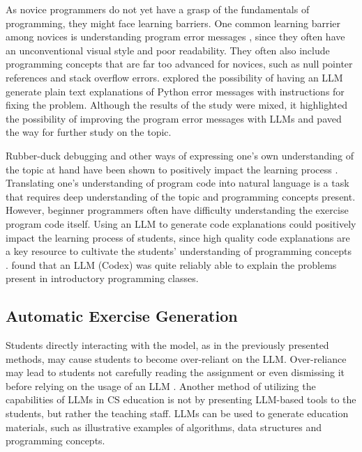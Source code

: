 \documentclass[english, 12pt, a4paper, sci, utf8, a-2b, online]{../definitions/aaltothesis}
\begin{document}
As novice programmers do not yet have a grasp of the fundamentals of programming, they might face learning barriers. One common learning barrier among novices is understanding program error messages \cite{10.1145/3328778.3366882}, since they often have an unconventional visual style and poor readability. They often also include programming concepts that are far too advanced for novices, such as null pointer references and stack overflow errors. \textcite{10.1145/3545945.3569770} explored the possibility of having an LLM generate plain text explanations of Python error messages with instructions for fixing the problem. Although the results of the study were mixed, it highlighted the possibility of improving the program error messages with LLMs and paved the way for further study on the topic.

Rubber-duck debugging and other ways of expressing one's own understanding of the topic at hand have been shown to positively impact the learning process \cite{10.1145/2505290}. Translating one's understanding of program code into natural language is a task that requires deep understanding of the topic and programming concepts present. However, beginner programmers often have difficulty understanding the exercise program code itself. Using an LLM to generate code explanations could positively impact the learning process of students, since high quality code explanations are a key resource to cultivate the students' understanding of programming concepts \cite{10.1145/3545945.3569759}. \textcite{10.1145/3501385.3543957} found that an LLM (Codex) was quite reliably able to explain the problems present in introductory programming classes. 

\subsection{Automatic Exercise Generation}

Students directly interacting with the model, as in the previously presented methods, may cause students to become over-reliant on the LLM. Over-reliance may lead to students not carefully reading the assignment or even dismissing it before relying on the usage of an LLM \cite{10.1145/3545945.3569759}. Another method of utilizing the capabilities of LLMs in CS education is not by presenting LLM-based tools to the students, but rather the teaching staff. LLMs can be used to generate education materials, such as illustrative examples of algorithms, data structures and programming concepts. 
\end{document}
